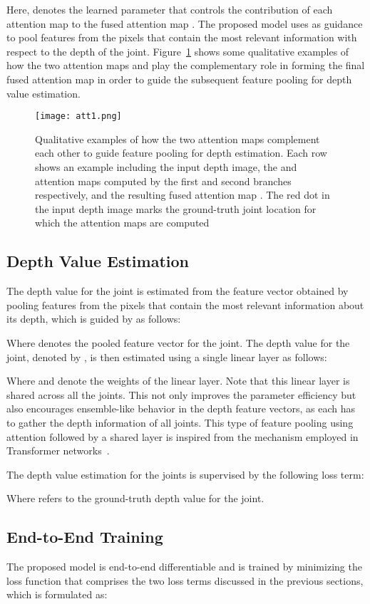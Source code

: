 \documentclass{article}
\begin{document}
Here,  denotes the learned parameter that controls the contribution of each attention map to the fused attention map . The proposed model uses  as guidance to pool features from the pixels that contain the most relevant information with respect to the depth of the  joint. Figure~\ref{fig:attention} shows some qualitative examples of how the two attention maps  and  play the complementary role in forming the final fused attention map  in order to guide the subsequent feature pooling for depth value estimation.


\begin{figure}[t]
\centering
\texttt{[image: att1.png]}
\caption{Qualitative examples of how the two attention maps complement each other to guide feature pooling for depth estimation. Each row shows an example including the input depth image, the  and  attention maps computed by the first and second branches respectively, and the resulting fused attention map . The red dot in the input depth image marks the ground-truth joint location for which the attention maps are computed}
\label{fig:attention}
\end{figure}

\subsection{Depth Value Estimation}
The depth value for the  joint is estimated from the feature vector obtained by pooling features from the pixels that contain the most relevant information about its depth, which is guided by  as follows:

Where  denotes the pooled feature vector for the  joint. The depth value for the  joint, denoted by , is then estimated using a single linear layer as follows:

Where  and  denote the weights of the linear layer. Note that this linear layer is shared across all the joints. This not only improves the parameter efficiency but also encourages ensemble-like behavior in the depth feature vectors, as each has to gather the depth information of all joints. This type of feature pooling using attention followed by a shared layer is inspired from the mechanism employed in Transformer networks~\cite{vaswani2017attention}.
\par
The depth value estimation for the joints is supervised by the following loss term:

Where  refers to the ground-truth depth value for the  joint. 

\subsection{End-to-End Training}
The proposed model is end-to-end differentiable and is trained by minimizing the loss function that comprises the two loss terms discussed in the previous sections, which is formulated as:
\end{document}

